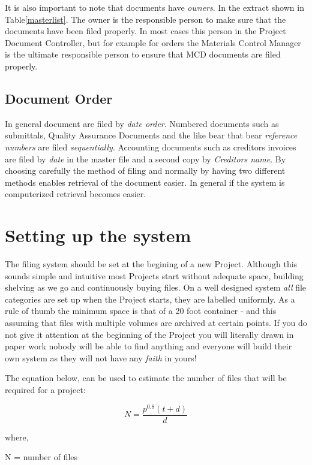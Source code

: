 It is also important to note that documents have \textit{owners}. In the extract shown in Table\ref{masterlist}. The owner is the responsible person to make sure that the documents have been filed properly. In most cases this person in the Project Document Controller, but for example for orders the Materials Control Manager is the ultimate responsible person to ensure that MCD documents are filed properly.

\subsection*{Document Order}

In general document are filed by \textit{date order}. Numbered documents such as submittals, Quality Assurance Documents and the like bear that bear \textit{reference numbers} are filed \textit{sequentially}. Accounting documents
such as creditors invoices are filed by \textit{date} in the master file and a second copy by \textit{Creditors name}. By choosing
carefully the method of filing and normally by having two different methods enables retrieval of the document easier. In general if the system
is computerized retrieval becomes easier.  

\section*{Setting up the system}

The filing system should be set at the begining of a new Project. Although this sounds simple and intuitive most Projects start without adequate
space, building shelving as we go and continuously buying files. On a well designed system \textit{all} file categories are set up when the Project starts, they are labelled uniformly. As a rule of thumb the minimum space is that of a 20 foot container - and this assuming that files with multiple volumes are archived at certain points. If you do not give it attention at the beginning of the Project you will literally
drawn in paper work nobody will be able to find anything and  everyone will build their own system as they will not have any \textit{faith} in yours!

The equation below, can be used to estimate the number of files that will be required for a project:



$$ N = \frac{p^{0.8}(t + d)}{d} $$

where,

N = number of files

